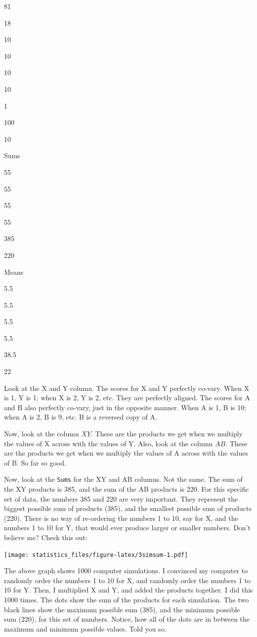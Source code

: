 \documentclass[]{book}
\begin{document}
81

18

10

10

10

10

1

100

10

Sums

55

55

55

55

385

220

Means

5.5

5.5

5.5

5.5

38.5

22

Look at the X and Y column. The scores for X and Y perfectly co-vary. When X is 1, Y is 1; when X is 2, Y is 2, etc. They are perfectly aligned. The scores for A and B also perfectly co-vary, just in the opposite manner. When A is 1, B is 10; when A is 2, B is 9, etc. B is a reversed copy of A.

Now, look at the column \(XY\). These are the products we get when we multiply the values of X across with the values of Y. Also, look at the column \(AB\). These are the products we get when we multiply the values of A across with the values of B. So far so good.

Now, look at the \texttt{Sums} for the XY and AB columns. Not the same. The sum of the XY products is 385, and the sum of the AB products is 220. For this specific set of data, the numbers 385 and 220 are very important. They represent the biggest possible sum of products (385), and the smallest possible sum of products (220). There is no way of re-ordering the numbers 1 to 10, say for X, and the numbers 1 to 10 for Y, that would ever produce larger or smaller numbers. Don't believe me? Check this out:

\texttt{[image: statistics\_files/figure-latex/3simsum-1.pdf]}

The above graph shows 1000 computer simulations. I convinced my computer to randomly order the numbers 1 to 10 for X, and randomly order the numbers 1 to 10 for Y. Then, I multiplied X and Y, and added the products together. I did this 1000 times. The dots show the sum of the products for each simulation. The two black lines show the maximum possible sum (385), and the minimum possible sum (220), for this set of numbers. Notice, how all of the dots are in between the maximum and minimum possible values. Told you so.
\end{document}
